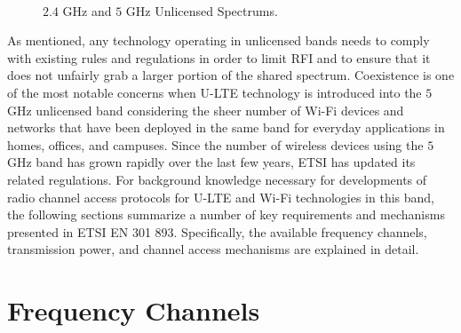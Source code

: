 \begin{figure}[!ht] 	
	\\
	\caption{$2.4$ GHz and $5$ GHz Unlicensed Spectrums.}
	\label{figs:2-5GHz-spectrum}
\end{figure}

As mentioned, any technology operating in unlicensed bands needs to comply with existing rules and regulations in order to limit RFI and to ensure that it does not unfairly grab a larger portion of the shared spectrum.  Coexistence is one of the most notable concerns when \mbox{U-LTE} technology is introduced into the $5$ GHz unlicensed band considering the sheer number of \mbox{Wi-Fi} devices and networks that have been deployed in the same band for everyday applications in homes, offices, and campuses. Since the number of wireless devices using the $5$ GHz band has grown rapidly over the last few years, ETSI has updated its related regulations. For background knowledge necessary for developments of radio channel access protocols for \mbox{U-LTE} and \mbox{Wi-Fi} technologies in this band, the following sections summarize a number of key requirements and mechanisms presented in ETSI EN 301 893. Specifically, the available frequency channels, transmission power, and channel access mechanisms are explained in detail.

\section{Frequency Channels}

